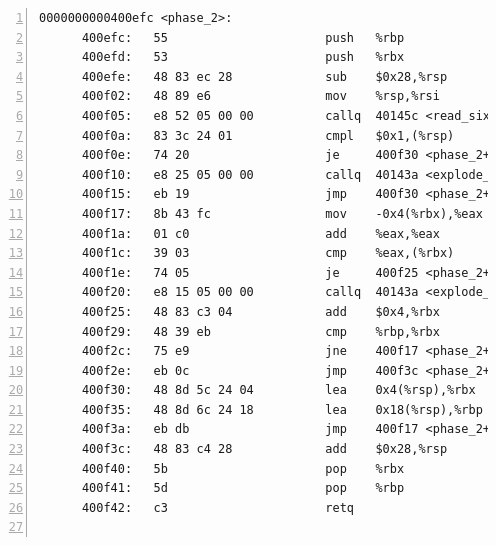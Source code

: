 \documentclass{article}
\begin{document}
\begin{lstlisting}[title = bomb的反汇编代码及部分注释, xleftmargin = 2em,xrightmargin = 2em, aboveskip = 1em, numbers = left, basicstyle=\scriptsize\ttfamily, numberstyle=\scriptsize]
    0000000000400efc <phase_2>:
      400efc:	55                   	push   %rbp
      400efd:	53                   	push   %rbx
      400efe:	48 83 ec 28          	sub    $0x28,%rsp					; %rsp -= 0x28;
      400f02:	48 89 e6             	mov    %rsp,%rsi					; %rsi = %rsp;
      400f05:	e8 52 05 00 00       	callq  40145c <read_six_numbers>	; read_six_numbers(...);
      400f0a:	83 3c 24 01          	cmpl   $0x1,(%rsp)					; if (M[%rsp] == 1)
      400f0e:	74 20                	je     400f30 <phase_2+0x34>		;	  goto #375;
      400f10:	e8 25 05 00 00       	callq  40143a <explode_bomb>		; explode_bomb(...);
      400f15:	eb 19                	jmp    400f30 <phase_2+0x34>		; goto #375;
      400f17:	8b 43 fc             	mov    -0x4(%rbx),%eax				; %eax = M[%rbx - 4];
      400f1a:	01 c0                	add    %eax,%eax					; %eax += %eax;
      400f1c:	39 03                	cmp    %eax,(%rbx)					; if (%eax == M[%rbx])
      400f1e:	74 05                	je     400f25 <phase_2+0x29>		;	  goto #371;
      400f20:	e8 15 05 00 00       	callq  40143a <explode_bomb>		; explode_bomb(...);
      400f25:	48 83 c3 04          	add    $0x4,%rbx					; %rbx += 4;
      400f29:	48 39 eb             	cmp    %rbp,%rbx					; if (%rbp != %rbx)
      400f2c:	75 e9                	jne    400f17 <phase_2+0x1b>		;	  goto #366;
      400f2e:	eb 0c                	jmp    400f3c <phase_2+0x40>		; goto #378;
      400f30:	48 8d 5c 24 04       	lea    0x4(%rsp),%rbx				; %rbx = %rsp + 0x4;
      400f35:	48 8d 6c 24 18       	lea    0x18(%rsp),%rbp				; %rbp = %rsp + 0x18;
      400f3a:	eb db                	jmp    400f17 <phase_2+0x1b>		; goto #366;
      400f3c:	48 83 c4 28          	add    $0x28,%rsp					; %rsp += 0x28;
      400f40:	5b                   	pop    %rbx
      400f41:	5d                   	pop    %rbp
      400f42:	c3                   	retq   
    

\end{lstlisting}
\end{document}
